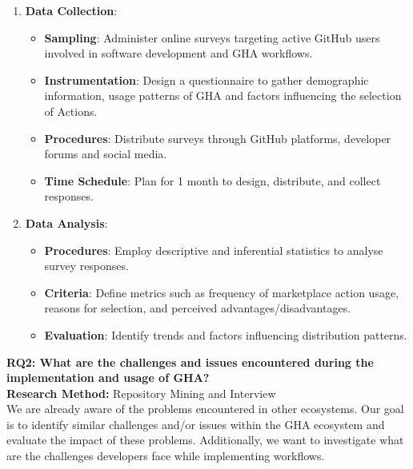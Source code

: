 \documentclass[conference]{IEEEtran}
\begin{document}
        \begin{enumerate}
            \item \textbf{Data Collection}:\\
            \begin{itemize}
                \item \textbf{Sampling}: Administer online surveys targeting active GitHub users involved in software development and GHA workflows.
                \item \textbf{Instrumentation}: Design a questionnaire to gather demographic information, usage patterns of GHA and factors influencing the selection of Actions.
                \item \textbf{Procedures}: Distribute surveys through GitHub platforms, developer forums and social media.
                \item \textbf{Time Schedule}: Plan for 1 month to design, distribute, and collect responses.\\
            \end{itemize}
            
            \item \textbf{Data Analysis}:\\
            \begin{itemize}
                \item \textbf{Procedures}: Employ descriptive and inferential statistics to analyse survey responses.
                \item \textbf{Criteria}: Define metrics such as frequency of marketplace action usage, reasons for selection, and perceived advantages/disadvantages.
                \item \textbf{Evaluation}: Identify trends and factors influencing distribution patterns.\\
            \end{itemize}
        \end{enumerate}

        \textbf{RQ2: What are the challenges and issues encountered during the implementation and usage of GHA?}\\

        \textbf{Research Method:} Repository Mining and Interview\\

        We are already aware of the problems encountered in other ecosystems. Our goal is to identify similar challenges and/or issues within the GHA ecosystem and evaluate the impact of these problems. Additionally, we want to investigate what are the challenges developers face while implementing workflows.\\
\end{document}

